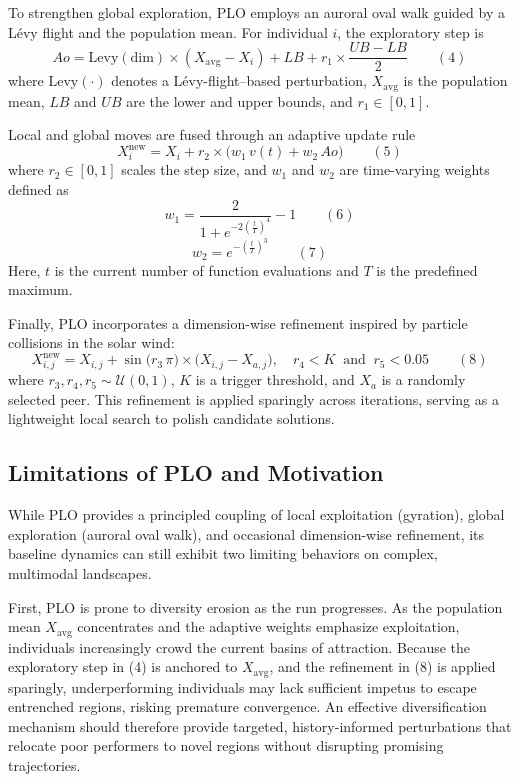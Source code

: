 \documentclass[3p]{elsarticle}
\begin{document}
To strengthen global exploration, PLO employs an auroral oval walk guided by a Lévy flight and the population mean. For individual \(i\), the exploratory step is
\[ Ao = \mathrm{Levy}(\mathrm{dim})\times(X_{\mathrm{avg}} - X_i) + LB + r_1\times\frac{UB - LB}{2} \qquad(4) \]
where \(\mathrm{Levy}(\cdot)\) denotes a Lévy-flight–based perturbation, \(X_{\mathrm{avg}}\) is the population mean, \(LB\) and \(UB\) are the lower and upper bounds, and \(r_1\in[0,1]\).

Local and global moves are fused through an adaptive update rule
\[ X_i^{\mathrm{new}} = X_i + r_2\times\bigl(w_1\,v(t) + w_2\,Ao\bigr) \qquad(5) \]
where \(r_2\in[0,1]\) scales the step size, and \(w_1\) and \(w_2\) are time-varying weights defined as
\[ w_1 = \frac{2}{1 + e^{-2\left(\tfrac{t}{T}\right)^{4}}} - 1 \qquad(6) \]
\[ w_2 = e^{-\left(\tfrac{t}{T}\right)^{3}} \qquad(7) \]
Here, \(t\) is the current number of function evaluations and \(T\) is the predefined maximum.

Finally, PLO incorporates a dimension-wise refinement inspired by particle collisions in the solar wind:
\[ X_{i,j}^{\mathrm{new}} = X_{i,j} + \sin\!\bigl(r_3\,\pi\bigr)\times\bigl(X_{i,j} - X_{a,j}\bigr),\quad r_4 < K\ \text{ and }\ r_5 < 0.05 \qquad(8) \]
where \(r_3, r_4, r_5\sim\mathcal{U}(0,1)\), \(K\) is a trigger threshold, and \(X_a\) is a randomly selected peer. This refinement is applied sparingly across iterations, serving as a lightweight local search to polish candidate solutions.

\subsection{Limitations of PLO and Motivation}
While PLO provides a principled coupling of local exploitation (gyration), global exploration (auroral oval walk), and occasional dimension-wise refinement, its baseline dynamics can still exhibit two limiting behaviors on complex, multimodal landscapes.

First, PLO is prone to diversity erosion as the run progresses. As the population mean \(X_{\mathrm{avg}}\) concentrates and the adaptive weights emphasize exploitation, individuals increasingly crowd the current basins of attraction. Because the exploratory step in (4) is anchored to \(X_{\mathrm{avg}}\), and the refinement in (8) is applied sparingly, underperforming individuals may lack sufficient impetus to escape entrenched regions, risking premature convergence. An effective diversification mechanism should therefore provide targeted, history-informed perturbations that relocate poor performers to novel regions without disrupting promising trajectories.
\end{document}
